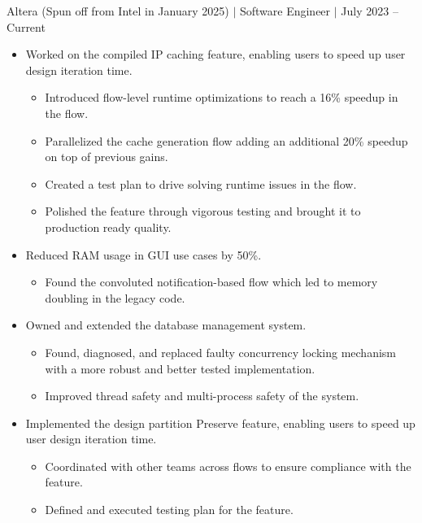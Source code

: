 \documentclass[12pt]{article}
\newcommand{\textDate}[3]{\noindent#1 $|$ #2 $|$ {\color{textGray} #3}}
\begin{document}
    \textDate{Altera (Spun off from Intel in January 2025)}{Software Engineer}{July 2023 -- Current}
    \begin{small}
        \begin{itemize}
            \itemsep0em 

            \item {Worked on the compiled IP caching feature, enabling users to speed up user design iteration time.}
                \begin{itemize}[label=$\circ$,topsep=-5px,partopsep=0px]
                    \itemsep0em 
                    \item {Introduced flow-level runtime optimizations to reach a 16\% speedup in the flow.}
                    \item {Parallelized the cache generation flow adding an additional 20\% speedup on top of previous gains.}
                    \item {Created a test plan to drive solving runtime issues in the flow.}
                    \item {Polished the feature through vigorous testing and brought it to production ready quality.}
                \end{itemize}

            \item {Reduced RAM usage in GUI use cases by 50\%.}
                \begin{itemize}[label=$\circ$,topsep=-5px,partopsep=0px]
                    \itemsep0em 
                    \item {Found the convoluted notification-based flow which led to memory doubling in the legacy code.}
                \end{itemize}

            \item {Owned and extended the database management system.}
                \begin{itemize}[label=$\circ$,topsep=-5px,partopsep=0px]
                    \itemsep0em 
                    \item {Found, diagnosed, and replaced faulty concurrency locking mechanism with a more robust and better tested implementation.}
                    \item {Improved thread safety and multi-process safety of the system.}
                \end{itemize}

            \item {Implemented the design partition Preserve feature, enabling users to speed up user design iteration time.}
                \begin{itemize}[label=$\circ$,topsep=-5px,partopsep=0px]
                    \itemsep0em 
                    \item {Coordinated with other teams across flows to ensure compliance with the feature.}
                    \item {Defined and executed testing plan for the feature.}
                \end{itemize}



\end{itemize}
\end{small}
\end{document}
